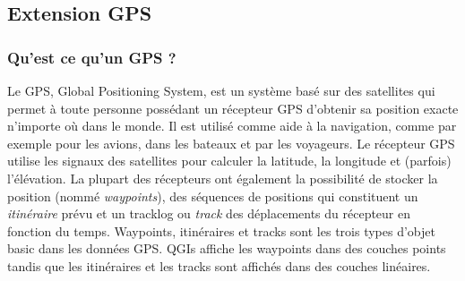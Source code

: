 
\subsection{Extension GPS}\label{label_plugingps}


\subsubsection{Qu'est ce qu'un GPS ?}\label{whatsgps}

Le GPS, Global Positioning System, est un système basé sur des satellites qui
permet à toute personne possédant un récepteur GPS d'obtenir sa position exacte
n'importe où dans le monde. Il est utilisé comme aide à la navigation, comme par
exemple pour les avions, dans les bateaux et par les voyageurs.
Le récepteur GPS utilise les signaux des satellites pour calculer la latitude,
la longitude et (parfois) l'élévation.
La plupart des récepteurs ont également la possibilité de stocker la position
(nommé \emph{waypoints}), des séquences de positions qui constituent un
\emph{itinéraire} prévu et un tracklog ou \emph{track} des déplacements du
récepteur en fonction du temps.
Waypoints, itinéraires et tracks sont les trois types d'objet basic dans les
données GPS. QGIs affiche les waypoints dans des couches points tandis que les
itinéraires et les tracks sont affichés dans des couches linéaires.

